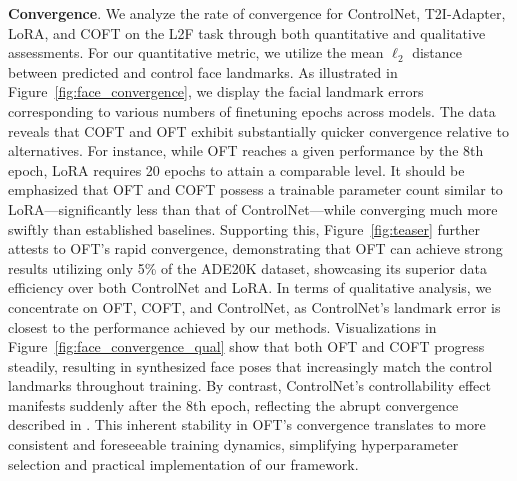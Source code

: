 \textbf{Convergence}. We analyze the rate of convergence for ControlNet, T2I-Adapter, LoRA, and COFT on the L2F task through both quantitative and qualitative assessments. For our quantitative metric, we utilize the mean $\ell_2$ distance between predicted and control face landmarks. As illustrated in Figure~\ref{fig:face_convergence}, we display the facial landmark errors corresponding to various numbers of finetuning epochs across models. The data reveals that COFT and OFT exhibit substantially quicker convergence relative to alternatives. For instance, while OFT reaches a given performance by the 8th epoch, LoRA requires 20 epochs to attain a comparable level. It should be emphasized that OFT and COFT possess a trainable parameter count similar to LoRA—significantly less than that of ControlNet—while converging much more swiftly than established baselines. Supporting this, Figure~\ref{fig:teaser} further attests to OFT’s rapid convergence, demonstrating that OFT can achieve strong results utilizing only 5\% of the ADE20K dataset, showcasing its superior data efficiency over both ControlNet and LoRA. In terms of qualitative analysis, we concentrate on OFT, COFT, and ControlNet, as ControlNet’s landmark error is closest to the performance achieved by our methods. Visualizations in Figure~\ref{fig:face_convergence_qual} show that both OFT and COFT progress steadily, resulting in synthesized face poses that increasingly match the control landmarks throughout training. By contrast, ControlNet’s controllability effect manifests suddenly after the 8th epoch, reflecting the abrupt convergence described in \cite{zhang2023adding}. This inherent stability in OFT’s convergence translates to more consistent and foreseeable training dynamics, simplifying hyperparameter selection and practical implementation of our framework.

